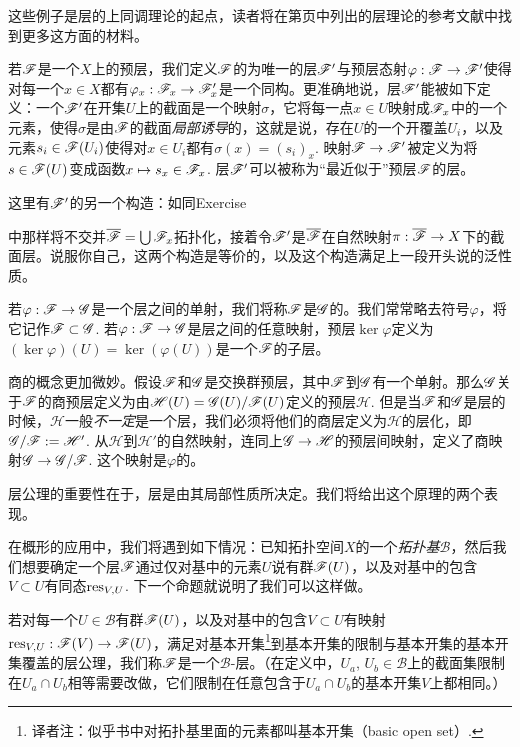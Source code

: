 这些例子是层的上同调理论的起点，读者将在第\pageref{ref:1}页中列出的层理论的参考文献中找到更多这方面的材料。

若$\mathscr{F}$是一个$X$上的预层，我们定义$\mathscr{F}$的为唯一的层$\mathscr{F}'$与预层态射$\varphi:\mathscr{F}\to\mathscr{F}'$使得对每一个$x\in X$都有$\varphi_x:\mathscr{F}_x\to\mathscr{F}'_x$是一个同构。更准确地说，层$\mathscr{F}'$能被如下定义：一个$\mathscr{F}'$在开集$U$上的截面是一个映射$\sigma$，它将每一点$x\in U$映射成$\mathscr{F}_x$中的一个元素，使得$\sigma$是由$\mathscr{F}$的截面\textit{局部诱导}的，这就是说，存在$U$的一个开覆盖$U_i$，以及元素$s_i\in \mathscr{F}(U_i)$使得对$x\in U_i$都有$\sigma(x)=(s_i)_x$. 映射$\mathscr{F}\to\mathscr{F}'$被定义为将$s\in\mathscr{F}(U)$变成函数$x\mapsto s_x\in\mathscr{F}_x$. 层$\mathscr{F}'$可以被称为“最近似于”预层$\mathscr{F}$的层。

\begin{exe}
	这里有$\mathscr{F}'$的另一个构造：如同Exercise {{\addtocounter{thm}{-3}}\thethm{\addtocounter{thm}{3}}}中那样将不交并$\overline{\mathscr{F}}=\bigcup \mathscr{F}_x$拓扑化，接着令$\mathscr{F}'$是$\overline{\mathscr{F}}$在自然映射$\pi:\overline{\mathscr{F}}\to X$下的截面层。说服你自己，这两个构造是等价的，以及这个构造满足上一段开头说的泛性质。
\end{exe}

若$\varphi:\mathscr{F}\to\mathscr{G}$是一个层之间的单射，我们将称$\mathscr{F}$是$\mathscr{G}$的。我们常常略去符号$\varphi$，将它记作$\mathscr{F}\subset \mathscr{G}$. 若$\varphi:\mathscr{F}\to\mathscr{G}$是层之间的任意映射，预层$\ker\varphi$定义为$(\ker\varphi)(U)=\ker(\varphi(U))$是一个$\mathscr{F}$的子层。

商的概念更加微妙。假设$\mathscr{F}$和$\mathscr{G}$是交换群预层，其中$\mathscr{F}$到$\mathscr{G}$有一个单射。那么$\mathscr{G}$关于$\mathscr{F}$的商预层定义为由$\mathscr{H}(U)=\mathscr{G}(U)/\mathscr{F}(U)$定义的预层$\mathscr{H}$. 但是当$\mathscr{F}$和$\mathscr{G}$是层的时候，$\mathscr{H}$一般\textit{不一定}是一个层，我们必须将他们的商层定义为$\mathscr{H}$的层化，即$\mathscr{G}/\mathscr{F}:=\mathscr{H}'$. 从$\mathscr{H}$到$\mathscr{H}'$的自然映射，连同上$\mathscr{G}\to \mathscr{H}$的预层间映射，定义了商映射$\mathscr{G}\to \mathscr{G}/\mathscr{F}$. 这个映射是$\varphi$的。

层公理的重要性在于，层是由其局部性质所决定。我们将给出这个原理的两个表现。

在概形的应用中，我们将遇到如下情况：已知拓扑空间$X$的一个\textit{拓扑基}$\mathscr{B}$，然后我们想要确定一个层$\mathscr{F}$通过仅对基中的元素$U$说有群$\mathscr{F}(U)$，以及对基中的包含$V\subset U$有同态$\operatorname{res}_{V,U}$. 下一个命题就说明了我们可以这样做。

若对每一个$U\in\mathscr{B}$有群$\mathscr{F}(U)$，以及对基中的包含$V\subset U$有映射$\operatorname{res}_{V,U}:\mathscr{F}(V)\to \mathscr{F}(U)$，满足对基本开集\footnote{译者注：似乎书中对拓扑基里面的元素都叫基本开集（basic open set）.}到基本开集的限制与基本开集的基本开集覆盖的层公理，我们称$\mathscr{F}$是一个$\mathscr{B}$-层。（在定义中，$U_a$, $U_b\in\mathscr{B}$上的截面集限制在$U_a\cap U_b$相等需要改做，它们限制在任意包含于$U_a\cap U_b$的基本开集$V$上都相同。）

